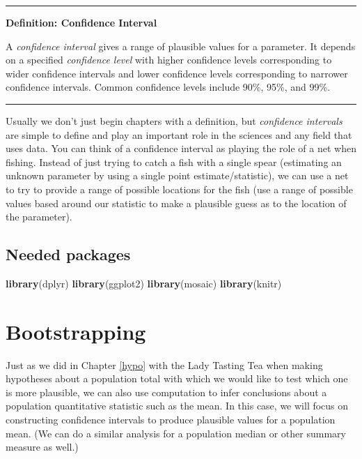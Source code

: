 \documentclass[]{tufte-book}
\newenvironment{Shaded}{\begin{snugshade}}{\end{snugshade}}
\newcommand{\KeywordTok}[1]{\textcolor[rgb]{0.13,0.29,0.53}{\textbf{{#1}}}}
\newcommand{\NormalTok}[1]{{#1}}
\let\oldrule=\rule
\renewcommand{\rule}[1]{\oldrule{\linewidth}}
\theoremstyle{definition}
\theoremstyle{definition}
\theoremstyle{remark}
\begin{document}
\begin{center}\rule{0.5\linewidth}{\linethickness}\end{center}

\textbf{Definition: Confidence Interval}

A \emph{confidence interval} gives a range of plausible values for a
parameter. It depends on a specified \emph{confidence level} with higher
confidence levels corresponding to wider confidence intervals and lower
confidence levels corresponding to narrower confidence intervals. Common
confidence levels include 90\%, 95\%, and 99\%.

\begin{center}\rule{0.5\linewidth}{\linethickness}\end{center}

Usually we don't just begin chapters with a definition, but
\emph{confidence intervals} are simple to define and play an important
role in the sciences and any field that uses data. You can think of a
confidence interval as playing the role of a net when fishing. Instead
of just trying to catch a fish with a single spear (estimating an
unknown parameter by using a single point estimate/statistic), we can
use a net to try to provide a range of possible locations for the fish
(use a range of possible values based around our statistic to make a
plausible guess as to the location of the parameter).

\subsection*{Needed packages}\label{needed-packages-5}

\begin{Shaded}
\begin{Highlighting}[]
\KeywordTok{library}\NormalTok{(dplyr)}
\KeywordTok{library}\NormalTok{(ggplot2)}
\KeywordTok{library}\NormalTok{(mosaic)}
\KeywordTok{library}\NormalTok{(knitr)}
\end{Highlighting}
\end{Shaded}

\section{Bootstrapping}\label{bootstrapping}

Just as we did in Chapter \ref{hypo} with the Lady Tasting Tea when
making hypotheses about a population total with which we would like to
test which one is more plausible, we can also use computation to infer
conclusions about a population quantitative statistic such as the mean.
In this case, we will focus on constructing confidence intervals to
produce plausible values for a population mean. (We can do a similar
analysis for a population median or other summary measure as well.)
\end{document}
